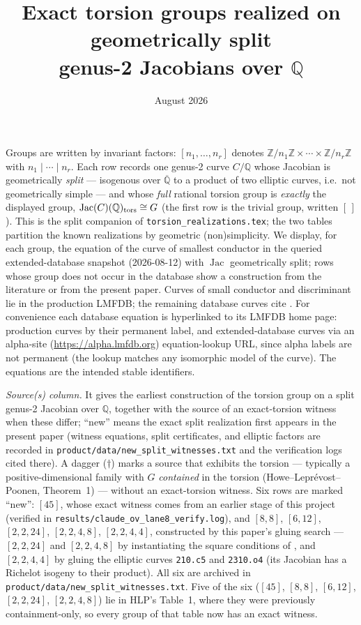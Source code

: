 \documentclass[11pt]{amsart}
\title{Exact torsion groups realized on geometrically split\\
genus-2 Jacobians over $\mathbb{Q}$}
\date{August 2026}
\begin{document}
\maketitle
\noindent Groups are written by invariant factors: $[n_1,\ldots,n_r]$ denotes
$\mathbb{Z}/n_1\mathbb{Z}\times\cdots\times\mathbb{Z}/n_r\mathbb{Z}$ with
$n_1\mid\cdots\mid n_r$.  Each row records one genus-2 curve $C/\mathbb{Q}$
whose Jacobian is geometrically \emph{split} --- isogenous over
$\overline{\mathbb{Q}}$ to a product of two elliptic curves, i.e.\ not
geometrically simple --- and whose \emph{full} rational torsion group is
\emph{exactly} the displayed group,
$\operatorname{Jac}(C)(\mathbb{Q})_{\rm tors}\cong G$ (the first row is the
trivial group, written $[\,]$).  This is the split companion of
\texttt{torsion\_realizations.tex}; the two tables partition the known
realizations by geometric (non)simplicity.  We display, for each group, the
equation of the curve of smallest conductor in the queried extended-database
snapshot (2026-08-12) with $\operatorname{Jac}$ geometrically split; rows
whose group does not occur in the database show a construction from the
literature or from the present paper.  Curves of small conductor and
discriminant lie in the production LMFDB; the remaining database curves cite
\cite{BookerSutherland}.  For convenience each database equation is
hyperlinked to its LMFDB home page: production curves by their permanent
label, and extended-database curves via an alpha-site
(\url{https://alpha.lmfdb.org}) equation-lookup URL, since alpha labels are
not permanent (the lookup matches any isomorphic model of the curve).  The
equations are the intended stable identifiers.

\emph{Source(s) column.}  It gives the earliest construction of the torsion
group on a split genus-2 Jacobian over $\mathbb{Q}$, together with the source
of an exact-torsion witness when these differ; ``new'' means the exact split
realization first appears in the present paper (witness equations, split
certificates, and elliptic factors are recorded in
\texttt{product/data/new\_split\_witnesses.txt} and the verification logs
cited there).  A dagger ($\dagger$) marks a source that exhibits the torsion
--- typically a positive-dimensional family with $G$ \emph{contained} in the
torsion (Howe--Lepr\'evost--Poonen, Theorem~1) --- without an exact-torsion
witness.  Six rows are marked ``new'': $[45]$, whose exact witness comes from
an earlier stage of this project (verified in
\texttt{results/claude\_ov\_lane8\_verify.log}), and $[8,8]$, $[6,12]$,
$[2,2,24]$, $[2,2,4,8]$, $[2,2,4,4]$, constructed by this paper's gluing
search --- $[2,2,24]$ and $[2,2,4,8]$ by instantiating the square conditions
of \cite[\S3.7]{HLP2000}, and $[2,2,4,4]$ by gluing the elliptic curves
\texttt{210.c5} and \texttt{2310.o4} (its Jacobian has a Richelot isogeny to
their product).  All six are archived in
\texttt{product/data/new\_split\_witnesses.txt}.  Five of the six ($[45]$,
$[8,8]$, $[6,12]$, $[2,2,24]$, $[2,2,4,8]$) lie in HLP's Table~1, where they
were previously containment-only, so every group of that table now has an
exact witness.
\end{document}
